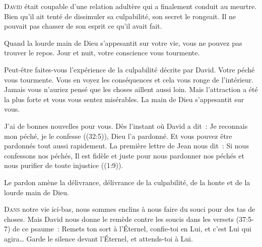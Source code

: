 
\lettrine{D}{avid} était coupable d'une relation adultère
 qui a finalement conduit au meurtre.
 Bien qu'il ait tenté de dissimuler sa culpabilité,
 son secret le rongeait.
 Il ne pouvait pas chasser de son esprit ce qu'il avait fait. 

Quand la lourde main de Dieu s'appesantit sur votre vie,
 vous ne pouvez pas trouver le repos.
 Jour et nuit, votre conscience vous tourmente. 


Peut-être faites-vous l'expérience de la culpabilité décrite par David.
 Votre péché vous tourmente.
 Vous en voyez les conséquences et cela vous ronge de l'intérieur.
 Jamais vous n'auriez pensé que les choses aillent aussi loin.
 Mais l'attraction a été la plus forte et vous vous sentez misérables.
 La main de Dieu s'appesantit sur vous. 

J'ai de bonnes nouvelles pour vous. Dès l'instant où David a dit~:
 \Og Je reconnais mon péché, je le confesse \Fg{} ((32:5)),
 Dieu l'a pardonné.
 Et vous pouvez être pardonnés tout aussi rapidement.
 La première lettre de Jean nous dit~:
 \Og Si nous confessons nos péchés, Il est fidèle et juste
 pour nous pardonner nos péchés et nous purifier de toute injustice \Fg{}
 ((1:9)).

Le pardon amène la délivrance, délivrance de la culpabilité,
 de la honte et de la lourde main de Dieu. 

\dvrule






\lettrine{D}{ans} notre vie ici-bas, nous sommes enclins
 à nous faire du souci pour des tas de choses.
 Mais David nous donne le remède contre les soucis dans
 les versets (37:5-7) de ce psaume~:
 \Og Remets ton sort à l'Éternel, confie-toi en Lui,
 et c'est Lui qui agira\dots{}
 Garde le silence devant l'Éternel, et attends-toi à Lui. \Fg{}

